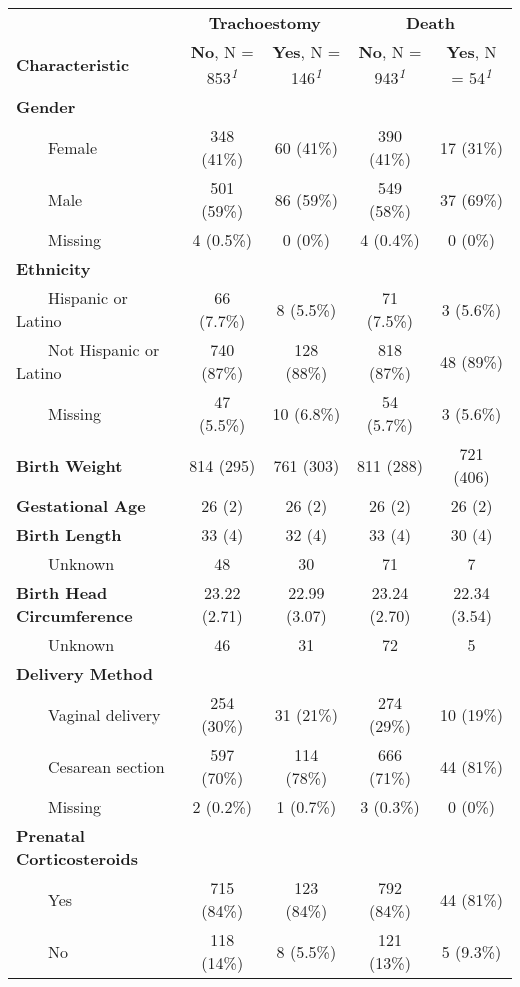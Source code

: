 \setlength{\LTpost}{0mm}
\begin{longtable}{lcccc}
\toprule
 & \multicolumn{2}{c}{\textbf{Trachoestomy}} & \multicolumn{2}{c}{\textbf{Death}} \\ 
\cmidrule(lr){2-3} \cmidrule(lr){4-5}
\textbf{Characteristic} & \textbf{No}, N = 853\textsuperscript{\textit{1}} & \textbf{Yes}, N = 146\textsuperscript{\textit{1}} & \textbf{No}, N = 943\textsuperscript{\textit{1}} & \textbf{Yes}, N = 54\textsuperscript{\textit{1}} \\ 
\midrule\addlinespace[2.5pt]
\textbf{Gender} &  &  &  &  \\ 
    Female & 348 (41\%) & 60 (41\%) & 390 (41\%) & 17 (31\%) \\ 
    Male & 501 (59\%) & 86 (59\%) & 549 (58\%) & 37 (69\%) \\ 
    Missing & 4 (0.5\%) & 0 (0\%) & 4 (0.4\%) & 0 (0\%) \\ 
\textbf{Ethnicity} &  &  &  &  \\ 
    Hispanic or Latino & 66 (7.7\%) & 8 (5.5\%) & 71 (7.5\%) & 3 (5.6\%) \\ 
    Not Hispanic or Latino & 740 (87\%) & 128 (88\%) & 818 (87\%) & 48 (89\%) \\ 
    Missing & 47 (5.5\%) & 10 (6.8\%) & 54 (5.7\%) & 3 (5.6\%) \\ 
\textbf{Birth Weight} & 814 (295) & 761 (303) & 811 (288) & 721 (406) \\ 
\textbf{ Gestational Age} & 26 (2) & 26 (2) & 26 (2) & 26 (2) \\ 
\textbf{Birth Length} & 33 (4) & 32 (4) & 33 (4) & 30 (4) \\ 
    Unknown & 48 & 30 & 71 & 7 \\ 
\textbf{Birth Head Circumference} & 23.22 (2.71) & 22.99 (3.07) & 23.24 (2.70) & 22.34 (3.54) \\ 
    Unknown & 46 & 31 & 72 & 5 \\ 
\textbf{Delivery Method} &  &  &  &  \\ 
    Vaginal delivery & 254 (30\%) & 31 (21\%) & 274 (29\%) & 10 (19\%) \\ 
    Cesarean section & 597 (70\%) & 114 (78\%) & 666 (71\%) & 44 (81\%) \\ 
    Missing & 2 (0.2\%) & 1 (0.7\%) & 3 (0.3\%) & 0 (0\%) \\ 
\textbf{Prenatal Corticosteroids} &  &  &  &  \\ 
    Yes & 715 (84\%) & 123 (84\%) & 792 (84\%) & 44 (81\%) \\ 
    No & 118 (14\%) & 8 (5.5\%) & 121 (13\%) & 5 (9.3\%) \\ 

\end{longtable}
